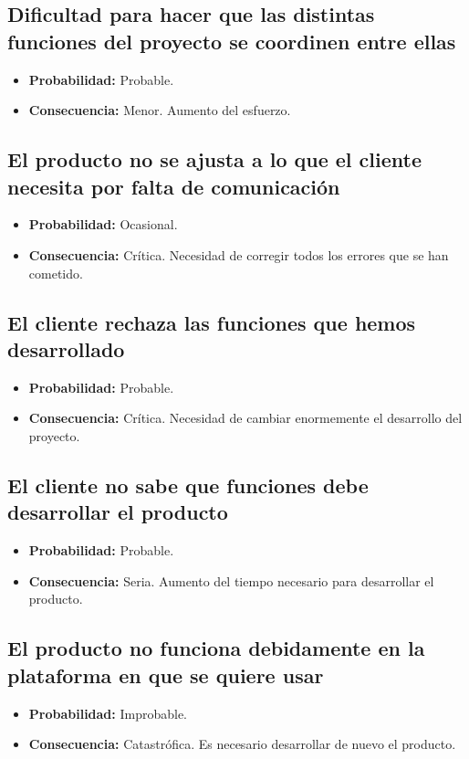 \documentclass[spanish,a4paper,12pt]{report}	%
\begin{document}
\subsection*{Dificultad para hacer que las distintas funciones del proyecto se coordinen entre ellas}
	\begin{itemize}
		\item \textbf {Probabilidad: }Probable.
		\item \textbf {Consecuencia: }Menor. Aumento del esfuerzo.
	\end{itemize}

\subsection*{El producto no se ajusta a lo que el cliente necesita por falta de comunicación}
	\begin{itemize}
		\item \textbf {Probabilidad: }Ocasional.
		\item \textbf {Consecuencia: }Crítica. Necesidad de corregir todos los errores que se han cometido.
	\end{itemize}

\subsection*{El cliente rechaza las funciones que hemos desarrollado}
	\begin{itemize}
		\item \textbf {Probabilidad: }Probable.
		\item \textbf {Consecuencia: }Crítica. Necesidad de cambiar enormemente el desarrollo del proyecto.
	\end{itemize}

\subsection*{El cliente no sabe que funciones debe desarrollar el producto}
	\begin{itemize}
		\item \textbf {Probabilidad: }Probable.
		\item \textbf {Consecuencia: }Seria. Aumento del tiempo necesario para desarrollar el producto.
	\end{itemize}

\subsection*{El producto no funciona debidamente en la plataforma en que se quiere usar}
	\begin{itemize}
		\item \textbf {Probabilidad: }Improbable.
		\item \textbf {Consecuencia: }Catastrófica. Es necesario desarrollar de nuevo el producto.
	\end{itemize}
\end{document}
